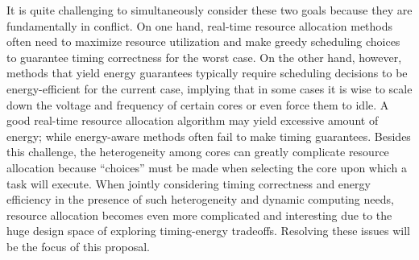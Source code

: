 It is quite challenging to simultaneously consider these two goals because they are fundamentally in conflict. 
On one hand, real-time resource allocation methods often need to maximize resource utilization and make greedy scheduling choices to guarantee timing correctness for the worst case. On the other hand, however, methods that yield energy guarantees typically require scheduling decisions to be energy-efficient for the current case, implying that in some cases it is wise to scale down the voltage and frequency of certain cores or even force them to idle. %
 A good real-time resource allocation algorithm may yield excessive amount of energy; while energy-aware methods often fail to make timing guarantees. %
  Besides this challenge, the heterogeneity among cores can greatly complicate resource allocation because ``choices'' must be made when selecting the core upon which a task will execute. When jointly considering timing correctness and energy efficiency in the presence of such heterogeneity and dynamic computing needs, resource allocation becomes even more complicated and interesting due to the huge design space of exploring timing-energy tradeoffs. Resolving these issues will be the focus of this proposal.

